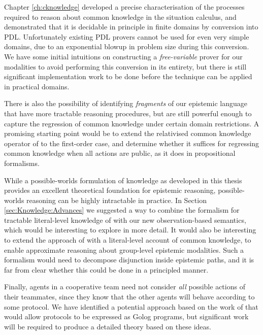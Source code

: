 Chapter \ref{ch:cknowledge} developed a precise characterisation
of the processes required to reason about common knowledge in the
situation calculus, and demonstrated that it is decidable in principle
in finite domains by conversion into PDL. Unfortunately existing PDL
provers cannot be used for even very simple domains, due to an exponential
blowup in problem size during this conversion. We have some initial
intuitions on constructing a \emph{free-variable} prover for our modalities
to avoid performing this conversion in its entirety, but there is
still significant implementation work to be done before the technique
can be applied in practical domains.

There is also the possibility of identifying \emph{fragments} of our
epistemic language that have more tractable reasoning procedures,
but are still powerful enough to capture the regression of common
knowledge under certain domain restrictions. A promising starting
point would be to extend the relativised common knowledge operator
of \citep{vanBenthem06lcc} to the first-order case, and determine
whether it suffices for regressing common knowledge when all actions
are public, as it does in propositional formalisms.

While a possible-worlds formulation of knowledge as developed in this
thesis provides an excellent theoretical foundation for epistemic
reasoning, possible-worlds reasoning can be highly intractable in
practice. In Section \ref{sec:Knowledge:Advances} we suggested a
way to combine the formalism for tractable literal-level knowledge
of \citep{demolombe00tractable_sc_belief} with our new observation-based
semantics, which would be interesting to explore in more detail. It
would also be interesting to extend the approach of \citep{demolombe00tractable_sc_belief}
with a literal-level account of common knowledge, to enable approximate
reasoning about group-level epistemic modalities. Such a formalism
would need to decompose disjunction inside epistemic paths, and it
is far from clear whether this could be done in a principled manner.

Finally, agents in a cooperative team need not consider \emph{all}
possible actions of their teammates, since they know that the other
agents will behave according to some protocol. We have identified
a potential approach based on the work of \citep{fritz08congolog_sin_trans}
that would allow protocols to be expressed as Golog programs, but
significant work will be required to produce a detailed theory based
on these ideas.

